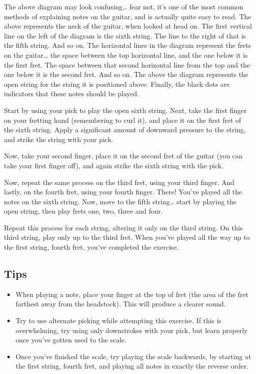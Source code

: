 The above diagram may look confusing\ldots{} fear not, it's one of the most common
methods of explaining notes on the guitar, and is actually quite easy to read.
The above represents the neck of the guitar, when looked at head on. The first
vertical line on the left of the diagram is the sixth string. The line to the
right of that is the fifth string. And so on. The horizontal lines in the
diagram represent the frets on the guitar\ldots{} the space between the top
horizontal line, and the one below it is the first fret. The space between that
second horizontal line from the top and the one below it is the second fret.
And so on. The  above the diagram represents the open string for the string
it is positioned above. Finally, the black dots are indicators that these notes
should be played.

Start by using your pick to play the open sixth string. Next, take the first
finger on your fretting hand (remembering to curl it), and place it on the
first fret of the sixth string. Apply a significant amount of downward pressure
to the string, and strike the string with your pick.

Now, take your second finger, place it on the second fret of the guitar (you
can take your first finger off), and again strike the sixth string with the
pick.

Now, repeat the same process on the third fret, using your third finger. And
lastly, on the fourth fret, using your fourth finger. There! You've played all
the notes on the sixth string. Now, move to the fifth string\ldots{} start by
playing the open string, then play frets one, two, three and four.

Repeat this process for each string, altering it only on the third string. On
this third string, play only up to the third fret. When you've played all the
way up to the first string, fourth fret, you've completed the exercise.

\subsection{Tips}
\begin{itemize}
\item When playing a note, place your finger at the top of fret (the area of
      the fret farthest away from the headstock). This will produce a clearer sound.
\item Try to use alternate picking while attempting this exercise. If this is
      overwhelming, try using only downstrokes with your pick, but learn properly
      once you've gotten used to the scale.
\item Once you've finished the scale, try playing the scale backwards, by
      starting at the first string, fourth fret, and playing all notes in exactly the
      reverse order.
\end{itemize}

